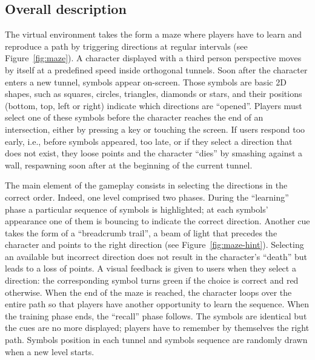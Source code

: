 \documentclass[]{sigchi}
\begin{document}
\subsection{Overall description}\label{overall-description}

The virtual environment takes the form a maze where players have to
learn and reproduce a path by triggering directions at regular intervals
(see Figure~\ref{fig:maze}). A character displayed with a third person
perspective moves by itself at a predefined speed inside orthogonal
tunnels. Soon after the character enters a new tunnel, symbols appear
on-screen. Those symbols are basic 2D shapes, such as squares, circles,
triangles, diamonds or stars, and their positions (bottom, top, left or
right) indicate which directions are ``opened''. Players must select one
of these symbols before the character reaches the end of an
intersection, either by pressing a key or touching the screen. If users
respond too early, i.e., before symbols appeared, too late, or if they
select a direction that does not exist, they loose points and the
character ``dies'' by smashing against a wall, respawning soon after at
the beginning of the current tunnel.

The main element of the gameplay consists in selecting the directions in
the correct order. Indeed, one level comprised two phases. During the
``learning'' phase a particular sequence of symbols is highlighted; at
each symbols' appearance one of them is bouncing to indicate the correct
direction. Another cue takes the form of a ``breadcrumb trail'', a beam
of light that precedes the character and points to the right direction
(see Figure~\ref{fig:maze-hint}). Selecting an available but incorrect
direction does not result in the character's ``death'' but leads to a
loss of points. A visual feedback is given to users when they select a
direction: the corresponding symbol turns green if the choice is correct
and red otherwise. When the end of the maze is reached, the character
loops over the entire path so that players have another opportunity to
learn the sequence. When the training phase ends, the ``recall'' phase
follows. The symbols are identical but the cues are no more displayed;
players have to remember by themselves the right path. Symbols position
in each tunnel and symbols sequence are randomly drawn when a new level
starts.
\end{document}
